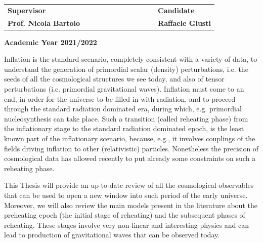 \documentclass[11pt,a4paper,twoside]{book}
\newenvironment{abstract}{\cleardoublepage\thispagestyle{empty}\null\vfill\begin{center}\bfseries\abstractname\end{center}}{\vfill\null}
\begin{document}
\begin{titlepage}
		\vspace{20mm}
		\begin{spacing}{2}
			\begin{tabular}{ l  c  c c c  cc c c c c  l }
				{\Large{\bf Supervisor}} &&&&&&&&&&& {\Large{\bf Candidate}}\\
				{\Large{\bf Prof. Nicola Bartolo}} &&&&&&&&&&& {\Large{\bf Raffaele Giusti}}\\
			\end{tabular}
		\end{spacing}
		\vspace{15 mm}
		
		\begin{center}
			{\Large{\bf Academic Year 2021/2022}}
		\end{center}
	\end{titlepage}
	\clearpage{\pagestyle{empty}\cleardoublepage}

\begin{abstract}
	Inflation is the standard scenario, completely consistent with a variety of data, to understand the  
	generation of primordial scalar (density) perturbations, i.e.  the seeds of all the cosmological structures we  
	see today, and also of tensor perturbations (i.e. primordial gravitational waves). Inflation must come to an  
	end, in order for the universe to be filled in with radiation, and to proceed  through the standard radiation  
	dominated era, during which, e.g. primordial nucleosynthesis can take place. Such a transition (called  
	reheating phase) from the inflationary stage to the standard radiation dominated epoch, is the least known  
	part of the inflationary scenario, because, e.g., it involves couplings of the fields driving inflation to other  
	(relativistic) particles.  	
	Nonetheless the precision of cosmological data has allowed recently to put already some constraints on  
	such a reheating phase.  
	
	This Thesis will provide an up-to-date review of all the cosmological observables that can be used to open  
	a new window into such period of the early universe. 	
	Moreover, we will also review the main models present in the literature about the preheating epoch (the initial stage of reheating) and the subsequent phases of reheating. These stages involve very non-linear and interesting physics and can lead to production of gravitational waves that can be observed today.
\end{abstract}
	
\tableofcontents
	
\end{document}
